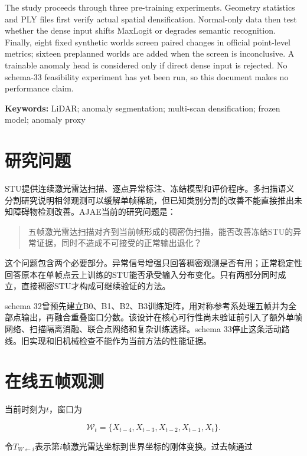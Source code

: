 \documentclass[UTF8,a4paper,zihao=5,fontset=none]{ctexart}
\begin{document}
The study proceeds through three pre-training experiments. Geometry statistics and PLY files first verify actual spatial densification. Normal-only data then test whether the dense input shifts MaxLogit or degrades semantic recognition. Finally, eight fixed synthetic worlds screen paired changes in official point-level metrics; sixteen preplanned worlds are added when the screen is inconclusive. A trainable anomaly head is considered only if direct dense input is rejected. No schema-33 feasibility experiment has yet been run, so this document makes no performance claim.

\noindent\textbf{Keywords:} LiDAR; anomaly segmentation; multi-scan densification; frozen model; anomaly proxy

\section{研究问题}

STU提供连续激光雷达扫描、逐点异常标注、冻结模型和评价程序\cite{nekrasov2025stu,stuofficial}。多扫描语义分割研究说明相邻观测可以缓解单帧稀疏\cite{li2023memoryseg,wu2024taseg}，但已知类别分割的改善不能直接推出未知障碍物检测改善。AJAE当前的研究问题是：

\begin{quote}
五帧激光雷达扫描对齐到当前帧形成的稠密伪扫描，能否改善冻结STU的异常证据，同时不造成不可接受的正常输出退化？
\end{quote}

这个问题包含两个必要部分。异常信号增强只回答稠密观测是否有用；正常稳定性回答原本在单帧点云上训练的STU能否承受输入分布变化。只有两部分同时成立，直接稠密STU才构成可继续验证的方法。

schema 32曾预先建立B0、B1、B2、B3训练矩阵，用对称参考系处理五帧并为全部点输出，再融合重叠窗口分数。该设计在核心可行性尚未验证前引入了额外单帧网络、扫描隔离消融、联合点网络和复杂训练选择。schema 33停止这条活动路线。旧实现和旧机械检查不能作为当前方法的性能证据。

\section{在线五帧观测}

当前时刻为$t$，窗口为

\begin{equation}
\mathcal W_t=\{X_{t-4},X_{t-3},X_{t-2},X_{t-1},X_t\}.
\end{equation}

令$T_{W\leftarrow i}$表示第$i$帧激光雷达坐标到世界坐标的刚体变换。过去帧通过
\end{document}
